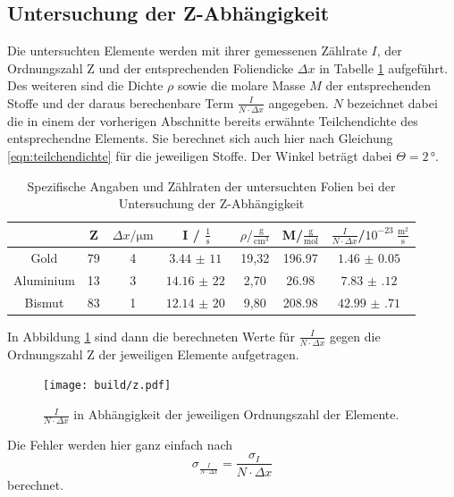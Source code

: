 \subsection{Untersuchung der Z-Abhängigkeit}
Die untersuchten Elemente werden mit ihrer gemessenen Zählrate $I$, der Ordnungszahl Z und der entsprechenden
Foliendicke $\Delta x$ in Tabelle \ref{tab:stoffe} aufgeführt. Des weiteren sind die Dichte $\rho$ sowie die
molare Masse $M$ der entsprechenden Stoffe und der daraus berechenbare Term $\frac{I}{N\cdot \Delta x}$
angegeben. $N$ bezeichnet dabei die in einem der vorherigen Abschnitte bereits erwähnte Teilchendichte des entsprechendne Elements.
Sie berechnet sich auch hier nach Gleichung \ref{eqn:teilchendichte} für die jeweiligen Stoffe.
Der Winkel beträgt dabei $\Theta = 2 \, °$.
\begin{table}[H]
  \centering
  \caption{Spezifische Angaben und Zählraten der untersuchten Folien bei der Untersuchung der Z-Abhängigkeit \cite{sample}}
  \label{tab:stoffe}
  \begin{tabular}{c c c c c c c}
    \toprule
     & Z & $\Delta x/ \mathrm{\mu m}$ & I / $\frac{1}{\mathrm{s}}$ & $\rho/ \mathrm{\frac{g}{cm^3}}$ & M/$\mathrm{\frac{g}{mol}}$ & $\frac{I}{N\cdot \Delta x}$/$ 10^{-23}\ \mathrm{\frac{m^2}{s}}$ \\
    \midrule
    Gold & 79 & 4 & $\SI{3,44(11)}{}$ & 19,32 & 196.97 & $\SI{1.46(5)}{}$ \\
    Aluminium & 13 & 3 & $\SI{14,16(22)}{}$ & 2,70 & 26.98 & $\SI{7.83(12)}{}$ \\
    Bismut & 83 & 1 & $\SI{12,14(20)}{}$ & 9,80 & 208.98 & $\SI{42.99(71)}{}$ \\
    \bottomrule
  \end{tabular}
\end{table}

In Abbildung \ref{fig:zmessung} sind dann die berechneten Werte für $\frac{I}{N\cdot \Delta x}$
gegen die Ordnungszahl Z der jeweiligen Elemente aufgetragen.

\begin{figure}[H]
  \centering
  \texttt{[image: build/z.pdf]}
  \caption{$\frac{I}{N\cdot \Delta x}$ in Abhängigkeit der jeweiligen Ordnungszahl der Elemente.}
  \label{fig:zmessung}
\end{figure}

Die Fehler werden hier ganz einfach nach
\begin{equation*}
  \sigma_{\frac{I}{N\cdot \Delta x}} = \frac{\sigma_I}{N\cdot \Delta x}
\end{equation*}
berechnet.
